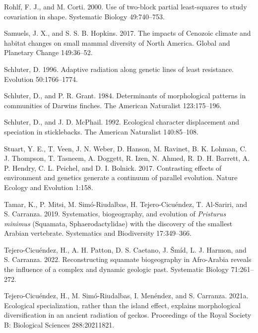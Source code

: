 \documentclass[
  11pt,
]{article}
\begin{document}
\leavevmode\hypertarget{ref-Rohlf2000}{}%
Rohlf, F. J., and M. Corti. 2000. Use of two-block partial least-squares
to study covariation in shape. Systematic Biology 49:740--753.

\leavevmode\hypertarget{ref-SamuelsHopkins2017}{}%
Samuels, J. X., and S. S. B. Hopkins. 2017. The impacts of Cenozoic
climate and habitat changes on small mammal diversity of North America.
Global and Planetary Change 149:36--52.

\leavevmode\hypertarget{ref-Schluter1996}{}%
Schluter, D. 1996. Adaptive radiation along genetic lines of least
resistance. Evolution 50:1766--1774.

\leavevmode\hypertarget{ref-Schluter1984}{}%
Schluter, D., and P. R. Grant. 1984. Determinants of morphological
patterns in communities of Darwins finches. The American Naturalist
123:175--196.

\leavevmode\hypertarget{ref-Schluter1992}{}%
Schluter, D., and J. D. McPhail. 1992. Ecological character displacement
and speciation in sticklebacks. The American Naturalist 140:85--108.

\leavevmode\hypertarget{ref-Stuart2017}{}%
Stuart, Y. E., T. Veen, J. N. Weber, D. Hanson, M. Ravinet, B. K.
Lohman, C. J. Thompson, T. Tasneem, A. Doggett, R. Izen, N. Ahmed, R. D.
H. Barrett, A. P. Hendry, C. L. Peichel, and D. I. Bolnick. 2017.
Contrasting effects of environment and genetics generate a continuum of
parallel evolution. Nature Ecology and Evolution 1:158.

\leavevmode\hypertarget{ref-Tamar2019}{}%
Tamar, K., P. Mitsi, M. Simó-Riudalbas, H. Tejero-Cicuéndez, T.
Al-Sariri, and S. Carranza. 2019. Systematics, biogeography, and
evolution of \emph{Pristurus minimus} (Squamata, Sphaerodactylidae) with
the discovery of the smallest Arabian vertebrate. Systematics and
Biodiversity 17:349--366.

\leavevmode\hypertarget{ref-Tejero-Cicuendez2022}{}%
Tejero-Cicuéndez, H., A. H. Patton, D. S. Caetano, J. Šmíd, L. J.
Harmon, and S. Carranza. 2022. Reconstructing squamate biogeography in
Afro-Arabia reveals the influence of a complex and dynamic geologic
past. Systematic Biology 71:261--272.

\leavevmode\hypertarget{ref-Tejero-Cicuendez2021}{}%
Tejero-Cicuéndez, H., M. Simó-Riudalbas, I. Menéndez, and S. Carranza.
2021a. Ecological specialization, rather than the island effect,
explains morphological diversification in an ancient radiation of
geckos. Proceedings of the Royal Society B: Biological Sciences
288:20211821.
\end{document}
